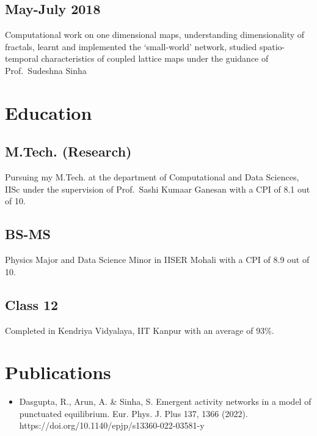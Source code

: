 \documentclass{article}
\begin{document}

\subsection{May-July 2018}

Computational work on one dimensional maps,
understanding dimensionality of fractals,
learnt and implemented the `small-world' network,
studied spatio-temporal characteristics
of coupled lattice maps
under the guidance of Prof.~Sudeshna Sinha

\section{Education}

\subsection{M.Tech. (Research)}
Pursuing my M.Tech. at the
department of Computational and Data Sciences, IISc
under the supervision of Prof.~Sashi Kumaar Ganesan
with a CPI of 8.1 out of 10.

\subsection{BS-MS}
Physics Major and Data Science Minor
in IISER Mohali with a CPI of 8.9 out of 10.

\subsection{Class 12} 
Completed in Kendriya Vidyalaya, IIT Kanpur
with an average of 93\%.

\section{Publications}

\begin{itemize}
  \item
Dasgupta, R., Arun, A. \& Sinha, S. Emergent activity networks in a model of punctuated equilibrium. Eur. Phys. J. Plus 137, 1366 (2022). https://doi.org/10.1140/epjp/s13360-022-03581-y
\end{itemize}
\end{document}
